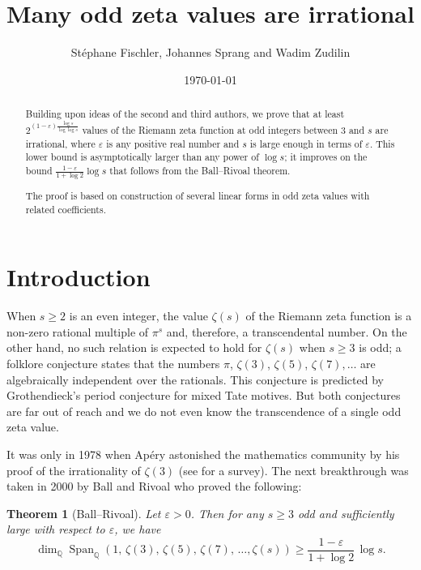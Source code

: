 \documentclass{article}
\title{Many odd zeta values are irrational}
\author{St\'ephane Fischler, Johannes Sprang and Wadim Zudilin}
\date{\today}
\numberwithin{equation}{section}
\newtheorem{Th}{Theorem}
\theoremstyle{remark}
\newcommand{\eps}{\varepsilon}
\newcommand{\Q}{\mathbb{Q}}
\newcommand{\Span}{\operatorname{Span}}
\begin{document}
\maketitle 

\begin{abstract}
Building upon ideas of the second and third authors, we prove that at least $2^{(1-\varepsilon)\frac{\log s}{\log \log s}}$ values of the Riemann zeta function at odd integers between 3 and $s$ are irrational, where $\varepsilon$ is any positive real number and $s$ is large enough in terms of $\varepsilon$.
This lower bound is asymptotically larger than any power of $\log s$; it improves on the bound $ \frac{1-\varepsilon}{1+\log 2} \log s $ that follows from the Ball--Rivoal theorem.
 
The proof is based on construction of several linear forms in odd zeta values with related coefficients.
\end{abstract} 



\section*{Introduction}

When $s\geq 2$ is an even integer, the value $\zeta(s)$ of the Riemann zeta function is a non-zero rational multiple of $\pi^s$ and, therefore, a transcendental number.  On the other hand, no such relation is expected to hold for  $\zeta(s)$ when $s\geq 3$ is odd; a folklore conjecture states that the numbers $\pi$, $\zeta(3)$, $\zeta(5)$, $\zeta(7),\ldots$ are algebraically independent over the rationals. This conjecture is predicted by Grothendieck's period conjecture for mixed Tate motives. But both conjectures are far out of reach and we do not even know the transcendence of a single odd zeta value.

\bigskip

 It was only in 1978 when Ap\'ery astonished the mathematics community by his proof \cite{Apery} of the irrationality of $\zeta(3)$ (see  \cite{SFBou} for a survey). 
 The next breakthrough was taken in 2000 by Ball and Rivoal \cite{BR, RivoalCRAS} who proved the following:

\begin{Th}[Ball--Rivoal] \label{thBR}
Let $\eps > 0$. Then for any $s\geq 3$ odd and sufficiently large with respect to $\eps$, we have
$$\dim_\Q \Span_\Q ( 1, \, \zeta(3), \, \zeta(5), \, \zeta(7), \, \ldots , \zeta(s)) \geq \frac{1-\eps}{1+\log 2}\,\log s.$$
\end{Th}
\end{document}
